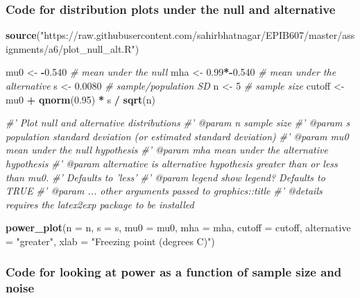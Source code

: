 \documentclass[]{book}
\makeatletter
\newenvironment{Shaded}{\begin{snugshade}}{\end{snugshade}}
\newcommand{\KeywordTok}[1]{\textcolor[rgb]{0.13,0.29,0.53}{\textbf{#1}}}
\newcommand{\DataTypeTok}[1]{\textcolor[rgb]{0.13,0.29,0.53}{#1}}
\newcommand{\DecValTok}[1]{\textcolor[rgb]{0.00,0.00,0.81}{#1}}
\newcommand{\FloatTok}[1]{\textcolor[rgb]{0.00,0.00,0.81}{#1}}
\newcommand{\StringTok}[1]{\textcolor[rgb]{0.31,0.60,0.02}{#1}}
\newcommand{\CommentTok}[1]{\textcolor[rgb]{0.56,0.35,0.01}{\textit{#1}}}
\newcommand{\OperatorTok}[1]{\textcolor[rgb]{0.81,0.36,0.00}{\textbf{#1}}}
\newcommand{\NormalTok}[1]{#1}
\newenvironment{kframe}{%
\medskip{}
\setlength{\fboxsep}{.8em}
 \def\at@end@of@kframe{}%
 \ifinner\ifhmode%
  \def\at@end@of@kframe{\end{minipage}}%
  \begin{minipage}{\columnwidth}%
 \fi\fi%
 \def\FrameCommand##1{\hskip\@totalleftmargin \hskip-\fboxsep
 \colorbox{shadecolor}{##1}\hskip-\fboxsep
     \hskip-\linewidth \hskip-\@totalleftmargin \hskip\columnwidth}%
 \MakeFramed {\advance\hsize-\width
   \@totalleftmargin\z@ \linewidth\hsize
   \@setminipage}}%
 {\par\unskip\endMakeFramed%
 \at@end@of@kframe}
\renewenvironment{Shaded}{\begin{kframe}}{\end{kframe}}
\theoremstyle{definition}
\theoremstyle{definition}
\theoremstyle{definition}
\theoremstyle{remark}
\makeatother
\begin{document}
\subsubsection{Code for distribution plots under the null and
alternative}\label{code-for-distribution-plots-under-the-null-and-alternative}

\begin{Shaded}
\begin{Highlighting}[]
\KeywordTok{source}\NormalTok{(}\StringTok{"https://raw.githubusercontent.com/sahirbhatnagar/EPIB607/master/assignments/a6/plot_null_alt.R"}\NormalTok{)}

\NormalTok{mu0 <-}\StringTok{ }\OperatorTok{-}\FloatTok{0.540} \CommentTok{# mean under the null}
\NormalTok{mha <-}\StringTok{ }\FloatTok{0.99}\OperatorTok{*-}\FloatTok{0.540} \CommentTok{# mean under the alternative}
\NormalTok{s <-}\StringTok{ }\FloatTok{0.0080} \CommentTok{# sample/population SD}
\NormalTok{n <-}\StringTok{ }\DecValTok{5} \CommentTok{# sample size}
\NormalTok{cutoff <-}\StringTok{ }\NormalTok{mu0 }\OperatorTok{+}\StringTok{ }\KeywordTok{qnorm}\NormalTok{(}\FloatTok{0.95}\NormalTok{) }\OperatorTok{*}\StringTok{ }\NormalTok{s }\OperatorTok{/}\StringTok{ }\KeywordTok{sqrt}\NormalTok{(n)}

\CommentTok{#' Plot null and alternative distributions}
\CommentTok{#' @param n sample size}
\CommentTok{#' @param s population standard deviation (or estimated standard deviation)}
\CommentTok{#' @param mu0 mean under the null hypothesis}
\CommentTok{#' @param mha mean under the alternative hypothesis}
\CommentTok{#' @param alternative is alternative hypothesis greater than or less than mu0.}
\CommentTok{#'   Defaults to 'less'}
\CommentTok{#' @param legend show legend? Defaults to TRUE}
\CommentTok{#' @param ... other arguments passed to graphics::title}
\CommentTok{#' @details requires the latex2exp package to be installed}

\KeywordTok{power_plot}\NormalTok{(}\DataTypeTok{n =}\NormalTok{ n, }
           \DataTypeTok{s =}\NormalTok{ s,  }
           \DataTypeTok{mu0 =}\NormalTok{ mu0, }
           \DataTypeTok{mha =}\NormalTok{ mha, }
           \DataTypeTok{cutoff =}\NormalTok{ cutoff,}
           \DataTypeTok{alternative =} \StringTok{"greater"}\NormalTok{,}
           \DataTypeTok{xlab =} \StringTok{"Freezing point (degrees C)"}\NormalTok{)}
\end{Highlighting}
\end{Shaded}

\subsubsection{Code for looking at power as a function of sample size
and
noise}\label{code-for-looking-at-power-as-a-function-of-sample-size-and-noise}
\end{document}
